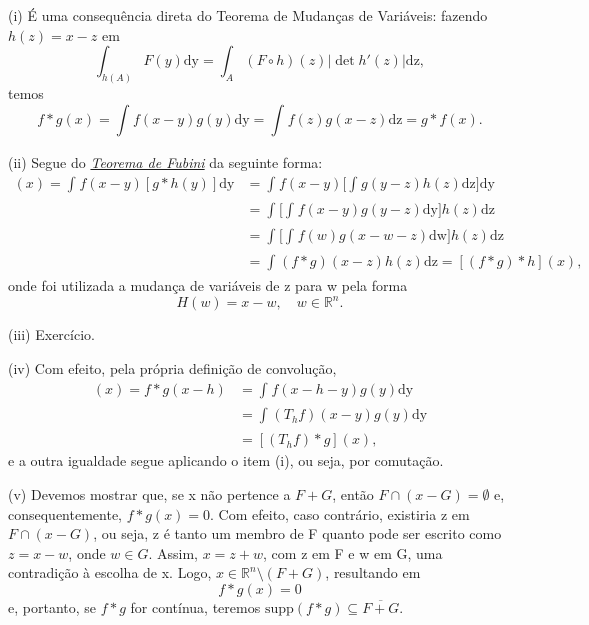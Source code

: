\documentclass[../distribution_theory_notes.tex]{subfiles}
\begin{document}
\begin{proof*}
  (i) É uma consequência direta do Teorema de Mudanças de Variáveis: fazendo \(h(z)=x-z\) em 
    \[
      \int_{h(A)}^{}F(y) \mathrm{dy}=\int_{A}^{}(F\circ h)(z) |\det{h'(z)}|\mathrm{dz},
    \]
    temos 
      \[
        f*g(x)=\int_{}^{}f(x-y)g(y) \mathrm{dy} = \int_{}^{}f(z)g(x-z) \mathrm{dz}=g*f(x).
      \]

      (ii) Segue do \hyperlink{fubini_tonelli}{\textit{Teorema de Fubini}} da seguinte forma: 
     \begin{align*}
       [f*(g*h)](x) = \int_{}^{}f(x-y)[g*h(y)] \mathrm{dy} &= \int_{}^{}f(x-y)\biggl[\int_{}^{}g(y-z)h(z) \mathrm{dz}\biggr] \mathrm{dy}\\ 
                                                           &= \int_{}^{}\biggl[\int_{}^{}f(x-y)g(y-z) \mathrm{dy}\biggr] h(z)\mathrm{dz}\\ 
                                                           &= \int_{}^{}\biggl[\int_{}^{}f(w)g(x-w-z) \mathrm{dw}\biggr]h(z) \mathrm{dz}\\ 
                                                           &= \int_{}^{}(f*g)(x-z)h(z) \mathrm{dz}  = [(f*g)*h](x),
     \end{align*}
     onde foi utilizada a mudança de variáveis de z para w pela forma 
       \[
         H(w)=x-w,\quad w\in \mathbb{R}^{n}.
       \]

       (iii) Exercício.

       (iv) Com efeito, pela própria definição de convolução, 
      \begin{align*}
        [T_h(f*g)](x)=f*g(x-h) &= \int_{}^{}f(x-h-y)g(y) \mathrm{dy}\\ 
                               &= \int_{}^{}(T_hf)(x-y)g(y) \mathrm{dy}\\ 
                               &= [(T_hf)*g](x),
      \end{align*}
      e a outra igualdade segue aplicando o item (i), ou seja, por comutação.

      (v) Devemos mostrar que, se x não pertence a \(F+G\), então \(F\cap (x-G)=\emptyset \) e, consequentemente, \(f*g(x)=0\). Com efeito, caso contrário, existiria z em \(F\cap (x-G)\), ou seja, z é tanto um membro de F quanto pode ser escrito como \(z=x-w\), onde \(w\in G\). Assim, \(x=z+w\), com z em F e w em G, uma contradição à escolha de x. Logo, \(x\in \mathbb{R}^{n}\setminus{(F+G)}\), resultando em 
        \[
          f*g(x)=0
        \]
        e, portanto, se \(f*g\) for contínua, teremos \(\mathrm{supp}(f*g)\subseteq \overline{F+G}.\) \qedsymbol
    \end{proof*}
\end{document}
